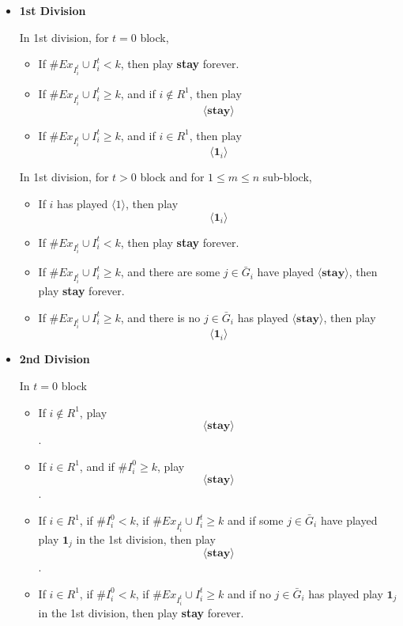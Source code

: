 \documentclass[12pt,letter]{article}
\theoremstyle{definition}
\theoremstyle{remark}
\theoremstyle{claim}
\begin{document}
\begin{itemize}





\item \textbf{1st Division} 

In 1st division, for $t=0$ block,

\begin{itemize}



\item If $\# Ex_{I^{t}_i}\cup I^{t}_i<k$, then play \textbf{stay} forever.

\item If $\# Ex_{I^{t}_i}\cup I^{t}_i \geq k$, and if $i\not\in R^1$, then play
\[\langle \textbf{stay} \rangle\]

\item If $\# Ex_{I^{t}_i}\cup I^{t}_i \geq k$, and if $i\in R^1$, then play
\[\langle \mathbf{1}_i \rangle\]


\end{itemize}

In 1st division, for $t>0$ block and for $1\leq m \leq n$ sub-block,
\begin{itemize}

\item If $i$ has played $\langle 1 \rangle$, then play 
\[\langle \mathbf{1}_i \rangle\]

\item If $\# Ex_{I^{t}_i}\cup I^{t}_i<k$, then play \textbf{stay} forever.

\item If $\# Ex_{I^{t}_i}\cup I^{t}_i\geq k$, and there are some $j\in \bar{G}_i$ have played $\langle \textbf{stay} \rangle $, then play
\textbf{stay} forever.
\item If $\# Ex_{I^{t}_i}\cup I^{t}_i \geq k$, and there is no $j\in \bar{G}_i$ has played $\langle \textbf{stay} \rangle $, then play
\[\langle \mathbf{1}_i \rangle\]

\end{itemize}




\item \textbf{2nd Division} 

In $t=0$ block
\begin{itemize}
\item If $i\notin R^1$, play \[\langle \textbf{stay} \rangle \].
\item If $i\in R^1$, and if $\#I^0_i\geq k$, play \[\langle \textbf{stay} \rangle \].
\item If $i\in R^1$, if $\#I^0_i< k$, if $\# Ex_{I^{t}_i}\cup I^{t}_i\geq k$ and if some $j\in \bar{G}_i$ have played play $\mathbf{1}_j$ in the 1st division, then play \[\langle \textbf{stay} \rangle \].
\item If $i\in R^1$, if $\#I^0_i< k$, if $\# Ex_{I^{t}_i}\cup I^{t}_i\geq k$ and if no $j\in \bar{G}_i$ has played play $\mathbf{1}_j$ in the 1st division, then play \textbf{stay} forever.


\end{itemize}
\end{itemize}
\end{document}
